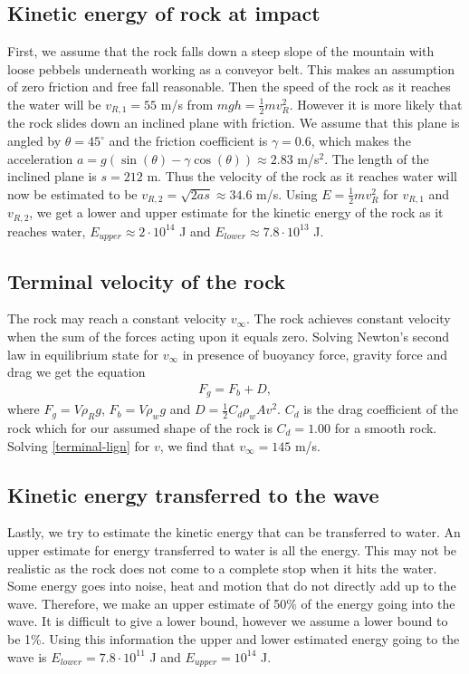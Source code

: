 \documentclass[11pt]{article}
\begin{document}
\subsection{Kinetic energy of rock at impact}
First, we assume that the rock falls down a steep slope of the mountain with loose pebbels underneath working as a conveyor belt. This makes an assumption of zero friction and free fall reasonable.
Then the speed of the rock as it reaches the water will be $v_{R,1}=55$ m/s from $mgh=\frac{1}{2}mv_R^2$. However it is more likely that the rock slides down an inclined plane with friction.
We assume that this plane is angled by $\theta=45^{\circ}$  and the friction coefficient is $\gamma=0.6$, which makes the acceleration $a=g(\sin(\theta) - \gamma \cos(\theta)) \approx 2.83$ m/s$^2$.
The length of the inclined plane is $s=212$ m. Thus the velocity of the rock as it reaches water will now be estimated to be $v_{R,2}=\sqrt{2as} \approx 34.6$ m/s.
Using $E =\frac{1}{2}m v_R^2$ for $v_{R,1}$ and $v_{R,2}$, we get a lower and upper estimate for the kinetic energy of the rock as it reaches water, $E_{upper} \approx 2 \cdot 10^{14}$ J and $E_{lower} \approx 7.8 \cdot 10^{13}$ J.

\subsection{Terminal velocity of the rock}
The rock may reach a constant velocity $v_{\infty}$. The rock achieves constant velocity when the sum of the forces acting upon it equals zero. Solving Newton's second law in equilibrium state for
$v_{\infty}$ in presence of buoyancy force, gravity force and drag we get the equation
\begin{align}
    \label{terminal-lign}
    F_g=F_b + D,
\end{align}
where $F_g=V\rho_{R}g$, $F_b= V \rho_{w}g$ and $D=\frac{1}{2}C_d\rho_{w}Av^2$. $C_d$ is the drag coefficient of the rock which for our assumed shape of the rock is $C_d=1.00$ for a smooth rock.
Solving \eqref{terminal-lign} for $v$, we find that $v_{\infty} = 145$ m/s. 

\subsection{Kinetic energy transferred to the wave}
Lastly, we try to estimate the kinetic energy that can be transferred to water. An upper estimate for energy transferred to water is all the energy. This may not be realistic as the rock does not
come to a complete stop when it hits the water. Some energy goes into noise, heat and motion that do not directly add up to the wave. Therefore, we make an upper estimate of 50\% of the energy going into the wave.
It is difficult to give a lower bound, however we assume a lower bound to be 1\%. Using this information the upper and lower estimated energy going to the wave is $E_{lower}=7.8 \cdot 10^{11}$ J and $E_{upper}=10^{14}$ J.
\end{document}

